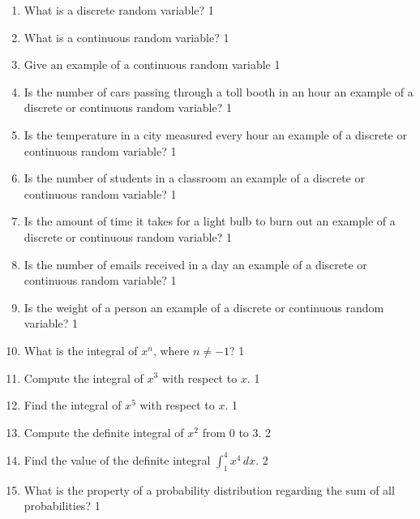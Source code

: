 \documentclass[a4paper,oneside, margin=1.4in]{book}
\begin{document}
  \begin{enumerate}


\item What is a discrete random variable? \hfill 1

\item What is a continuous random variable? \hfill 1

\item Give an example of a continuous random variable \hfill 1

\item Is the number of cars passing through a toll booth in an hour an example of a discrete or continuous random variable? \hfill 1

\item Is the temperature in a city measured every hour an example of a discrete or continuous random variable? \hfill 1

\item Is the number of students in a classroom an example of a discrete or continuous random variable? \hfill 1

\item Is the amount of time it takes for a light bulb to burn out an example of a discrete or continuous random variable? \hfill 1

\item Is the number of emails received in a day an example of a discrete or continuous random variable? \hfill 1

\item Is the weight of a person an example of a discrete or continuous random variable? \hfill 1

\item What is the integral of \( x^n \), where \( n \neq -1 \)? \hfill 1

\item Compute the integral of \( x^3 \) with respect to \( x \). \hfill 1

\item Find the integral of \( x^5 \) with respect to \( x \). \hfill 1

\item Compute the definite integral of \( x^2 \) from 0 to 3. \hfill 2

\item Find the value of the definite integral \( \int_1^4 x^4 \, dx \). \hfill 2

\item What is the property of a probability distribution regarding the sum of all probabilities? \hfill 1


\end{enumerate}
\end{document}
